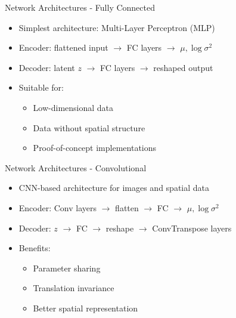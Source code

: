 \documentclass[5pt,aspectratio=169]{beamer}
\begin{document}
\begin{frame}{Network Architectures - Fully Connected}
\begin{itemize}
\item Simplest architecture: Multi-Layer Perceptron (MLP)
\item Encoder: flattened input $\to$ FC layers $\to$ $\mu, \log\sigma^2$
\item Decoder: latent $z$ $\to$ FC layers $\to$ reshaped output
\item Suitable for:
  \begin{itemize}
  \item Low-dimensional data
  \item Data without spatial structure
  \item Proof-of-concept implementations
  \end{itemize}
\end{itemize}

\begin{center}
\end{center}
\end{frame}

\begin{frame}{Network Architectures - Convolutional}
\begin{itemize}
\item CNN-based architecture for images and spatial data
\item Encoder: Conv layers $\to$ flatten $\to$ FC $\to$ $\mu, \log\sigma^2$
\item Decoder: $z$ $\to$ FC $\to$ reshape $\to$ ConvTranspose layers
\item Benefits:
  \begin{itemize}
  \item Parameter sharing
  \item Translation invariance
  \item Better spatial representation
  \end{itemize}
\end{itemize}
\end{frame}
\end{document}
